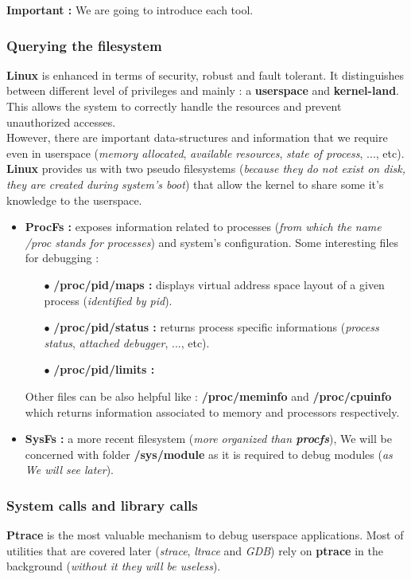  
 
    
\textbf{\color{red}Important : } We are going to introduce each tool.
\subsubsection{Querying the filesystem}
\textbf{Linux} is enhanced in terms of security, robust and fault tolerant. It distinguishes between different level of privileges
and mainly : a \textbf{userspace} and \textbf{kernel-land}. This allows the system to correctly handle the resources and prevent unauthorized accesses.\\

However, there are important data-structures and information that we require even in userspace (\emph{memory allocated}, \emph{available resources}, \emph{state of process}, ..., etc). \textbf{Linux} provides us with two pseudo filesystems (\textit{because they do not exist on disk, they are created during system's boot}) that allow the kernel to share some it's knowledge to the userspace.    

\begin{itemize}
	\item \textbf{ProcFs : } exposes information related to processes (\emph{from which the name /proc stands for processes}) and system's configuration. Some interesting files for debugging :
		\begin{itemize}
			\item[$\bullet$] \textbf{/proc/pid/maps : } displays virtual address space layout of a given process (\textit{identified by pid}).
			\item[$\bullet$] \textbf{/proc/pid/status : } returns process specific informations (\emph{process status}, \emph{{\color{red}attached debugger}}, ..., etc).
			\item[$\bullet$] \textbf{/proc/pid/limits : }						
		\end{itemize}
Other files can be also helpful like : \textbf{/proc/meminfo} and \textbf{/proc/cpuinfo} which returns information associated to memory and processors respectively.	
	\item \textbf{SysFs : } a more recent filesystem (\emph{more organized than \textbf{procfs}}), We will be concerned with folder \textbf{/sys/module} as it is required to debug modules (\textit{as We will see later}). 
	
	
\end{itemize}

\subsubsection{System calls and library calls}
\label{System calls and library calls}
\textbf{Ptrace} is the most valuable mechanism to debug userspace applications. Most of utilities that are covered later (\emph{strace}, \emph{ltrace} and \emph{GDB}) rely on \textbf{ptrace} in the background (\emph{without it they will be useless}).\\

